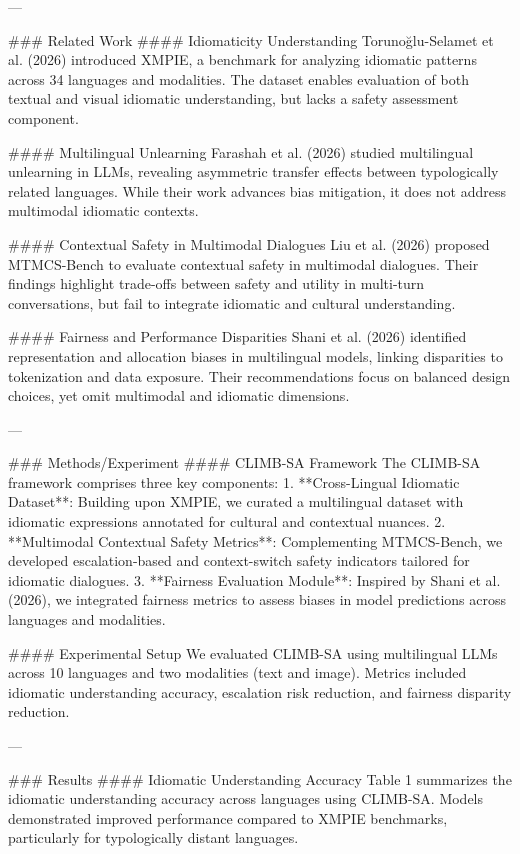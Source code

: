 ---

### Related Work  
#### Idiomaticity Understanding  
Torunoğlu-Selamet et al. (2026) introduced XMPIE, a benchmark for analyzing idiomatic patterns across 34 languages and modalities. The dataset enables evaluation of both textual and visual idiomatic understanding, but lacks a safety assessment component.

#### Multilingual Unlearning  
Farashah et al. (2026) studied multilingual unlearning in LLMs, revealing asymmetric transfer effects between typologically related languages. While their work advances bias mitigation, it does not address multimodal idiomatic contexts.

#### Contextual Safety in Multimodal Dialogues  
Liu et al. (2026) proposed MTMCS-Bench to evaluate contextual safety in multimodal dialogues. Their findings highlight trade-offs between safety and utility in multi-turn conversations, but fail to integrate idiomatic and cultural understanding.

#### Fairness and Performance Disparities  
Shani et al. (2026) identified representation and allocation biases in multilingual models, linking disparities to tokenization and data exposure. Their recommendations focus on balanced design choices, yet omit multimodal and idiomatic dimensions.

---

### Methods/Experiment  
#### CLIMB-SA Framework  
The CLIMB-SA framework comprises three key components:  
1. **Cross-Lingual Idiomatic Dataset**: Building upon XMPIE, we curated a multilingual dataset with idiomatic expressions annotated for cultural and contextual nuances.  
2. **Multimodal Contextual Safety Metrics**: Complementing MTMCS-Bench, we developed escalation-based and context-switch safety indicators tailored for idiomatic dialogues.  
3. **Fairness Evaluation Module**: Inspired by Shani et al. (2026), we integrated fairness metrics to assess biases in model predictions across languages and modalities.

#### Experimental Setup  
We evaluated CLIMB-SA using multilingual LLMs across 10 languages and two modalities (text and image). Metrics included idiomatic understanding accuracy, escalation risk reduction, and fairness disparity reduction.

---

### Results  
#### Idiomatic Understanding Accuracy  
Table 1 summarizes the idiomatic understanding accuracy across languages using CLIMB-SA. Models demonstrated improved performance compared to XMPIE benchmarks, particularly for typologically distant languages.

